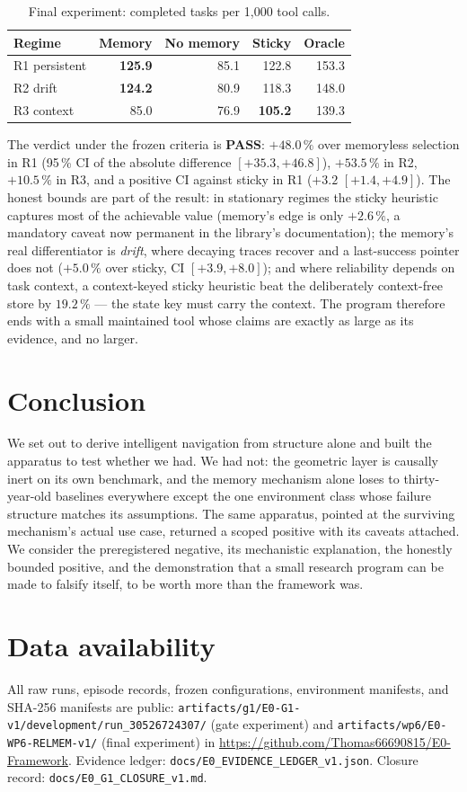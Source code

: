 \documentclass[11pt]{article}
\begin{document}
\begin{table}[ht]
\centering
\begin{tabular}{lrrrr}
\toprule
Regime & Memory & No memory & Sticky & Oracle \\
\midrule
R1 persistent & \textbf{125.9} & 85.1 & 122.8 & 153.3 \\
R2 drift & \textbf{124.2} & 80.9 & 118.3 & 148.0 \\
R3 context & 85.0 & 76.9 & \textbf{105.2} & 139.3 \\
\bottomrule
\end{tabular}
\caption{Final experiment: completed tasks per 1{,}000 tool calls.}
\label{tab:wp6}
\end{table}

The verdict under the frozen criteria is \textbf{PASS}: $+48.0\,\%$ over
memoryless selection in R1 (95\,\% CI of the absolute difference
$[+35.3, +46.8]$), $+53.5\,\%$ in R2, $+10.5\,\%$ in R3, and a positive CI
against sticky in R1 ($+3.2$ $[+1.4, +4.9]$). The honest bounds are part of
the result: in stationary regimes the sticky heuristic captures most of the
achievable value (memory's edge is only $+2.6\,\%$, a mandatory caveat now
permanent in the library's documentation); the memory's real differentiator
is \emph{drift}, where decaying traces recover and a last-success pointer
does not ($+5.0\,\%$ over sticky, CI $[+3.9, +8.0]$); and where reliability
depends on task context, a context-keyed sticky heuristic beat the
deliberately context-free store by $19.2\,\%$ --- the state key must carry
the context. The program therefore ends with a small maintained tool whose
claims are exactly as large as its evidence, and no larger.

\section{Conclusion}

We set out to derive intelligent navigation from structure alone and built
the apparatus to test whether we had. We had not: the geometric layer is
causally inert on its own benchmark, and the memory mechanism alone loses to
thirty-year-old baselines everywhere except the one environment class whose
failure structure matches its assumptions. The same apparatus, pointed at
the surviving mechanism's actual use case, returned a scoped positive with
its caveats attached. We consider the preregistered negative, its
mechanistic explanation, the honestly bounded positive, and the
demonstration that a small research program can be made to falsify itself,
to be worth more than the framework was.

\section*{Data availability}

All raw runs, episode records, frozen configurations, environment manifests,
and SHA-256 manifests are public:
\texttt{artifacts/g1/E0-G1-v1/development/run\_30526724307/} (gate
experiment) and \texttt{artifacts/wp6/E0-WP6-RELMEM-v1/} (final experiment)
in \url{https://github.com/Thomas66690815/E0-Framework}. Evidence ledger:
\texttt{docs/E0\_EVIDENCE\_LEDGER\_v1.json}. Closure record:
\texttt{docs/E0\_G1\_CLOSURE\_v1.md}.
\end{document}
